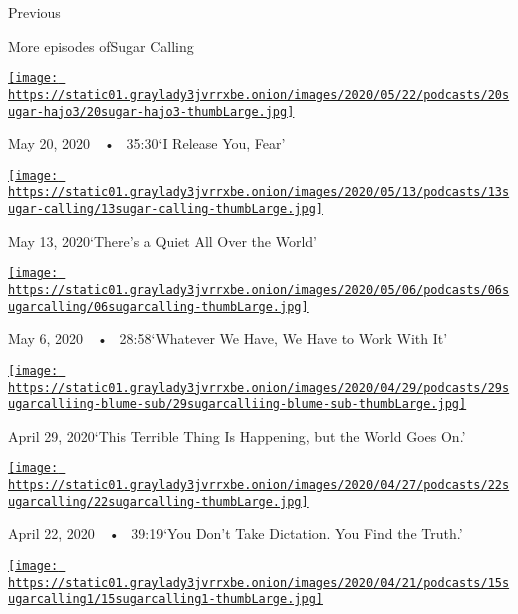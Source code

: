 Previous

More episodes ofSugar Calling

\href{https://www.nytimes3xbfgragh.onion/2020/05/20/podcasts/sugar-calling-joy-harjo-poetry-virus.html?action=click\&module=audio-series-bar\&region=header\&pgtype=Article}{\texttt{[image: https://static01.graylady3jvrrxbe.onion/images/2020/05/22/podcasts/20sugar-hajo3/20sugar-hajo3-thumbLarge.jpg]}}

May 20, 2020~~•~ 35:30`I Release You, Fear'

\href{https://www.nytimes3xbfgragh.onion/2020/05/13/podcasts/sugar-calling-billy-collins-poetry-virus.html?action=click\&module=audio-series-bar\&region=header\&pgtype=Article}{\texttt{[image: https://static01.graylady3jvrrxbe.onion/images/2020/05/13/podcasts/13sugar-calling/13sugar-calling-thumbLarge.jpg]}}

May 13, 2020`There's a Quiet All Over the World'

\href{https://www.nytimes3xbfgragh.onion/2020/05/06/podcasts/sugar-calling-alice-walker-quarantine-virus.html?action=click\&module=audio-series-bar\&region=header\&pgtype=Article}{\texttt{[image: https://static01.graylady3jvrrxbe.onion/images/2020/05/06/podcasts/06sugarcalling/06sugarcalling-thumbLarge.jpg]}}

May 6, 2020~~•~ 28:58`Whatever We Have, We Have to Work With It'

\href{https://www.nytimes3xbfgragh.onion/2020/04/29/podcasts/sugar-calling-judy-blume-quarantine-virus.html?action=click\&module=audio-series-bar\&region=header\&pgtype=Article}{\texttt{[image: https://static01.graylady3jvrrxbe.onion/images/2020/04/29/podcasts/29sugarcalliing-blume-sub/29sugarcalliing-blume-sub-thumbLarge.jpg]}}

April 29, 2020`This Terrible Thing Is Happening, but the World Goes On.'

\href{https://www.nytimes3xbfgragh.onion/2020/04/22/podcasts/sugar-calling-amy-tan-quarantine-virus.html?action=click\&module=audio-series-bar\&region=header\&pgtype=Article}{\texttt{[image: https://static01.graylady3jvrrxbe.onion/images/2020/04/27/podcasts/22sugarcalling/22sugarcalling-thumbLarge.jpg]}}

April 22, 2020~~•~ 39:19`You Don't Take Dictation. You Find the Truth.'

\href{https://www.nytimes3xbfgragh.onion/2020/04/15/podcasts/sugar-calling-pico-iyer-coronavirus.html?action=click\&module=audio-series-bar\&region=header\&pgtype=Article}{\texttt{[image: https://static01.graylady3jvrrxbe.onion/images/2020/04/21/podcasts/15sugarcalling1/15sugarcalling1-thumbLarge.jpg]}}

